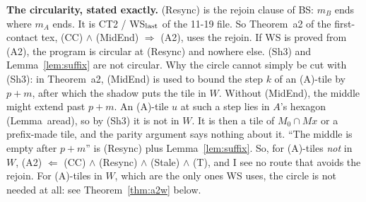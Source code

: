 \documentclass[11pt]{article}
\theoremstyle{definition}\newtheorem{definition}[theorem]{Definition}\newtheorem{remark}[theorem]{Remark}
\begin{document}
\textbf{The circularity, stated exactly.} (Resync) is the rejoin clause of BS: $m_B$ ends where $m_A$ ends. It is CT2 / WS$_{\rm last}$ of the 11-19 file. So Theorem~a2 of the first-contact tex, (CC) $\wedge$ (MidEnd) $\Rightarrow$ (A2), uses the rejoin. If WS is proved from (A2), the program is circular at (Resync) and nowhere else. (Sh3) and Lemma~\ref{lem:suffix} are not circular.
Why the circle cannot simply be cut with (Sh3): in Theorem~a2, (MidEnd) is used to bound the step $k$ of an (A)-tile by $p+m$, after which the shadow puts the tile in $W$. Without (MidEnd), the middle might extend past $p+m$. An (A)-tile $u$ at such a step lies in $A$'s hexagon (Lemma~aread), so by (Sh3) it is not in $W$. It is then a tile of $M_0\cap Mx$ or a prefix-made tile, and the parity argument says nothing about it. ``The middle is empty after $p+m$'' is (Resync) plus Lemma~\ref{lem:suffix}. So, for (A)-tiles \emph{not} in $W$, (A2) $\Leftarrow$ (CC) $\wedge$ (Resync) $\wedge$ (Stale) $\wedge$ (T), and I see no route that avoids the rejoin. For (A)-tiles in $W$, which are the only ones WS uses, the circle is not needed at all: see Theorem~\ref{thm:a2w} below.
\end{document}
